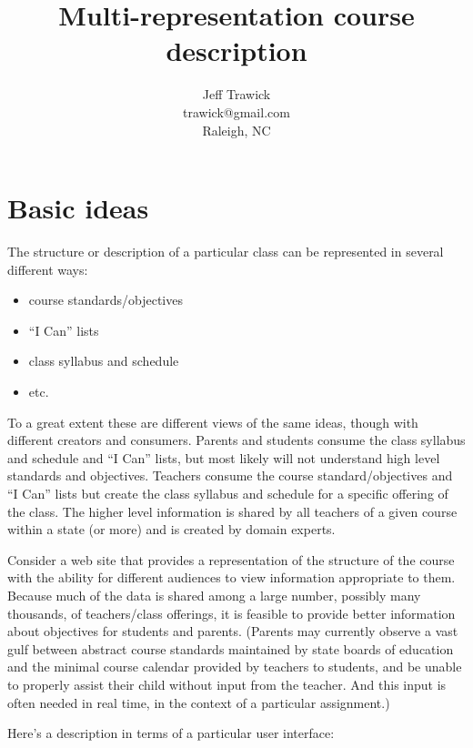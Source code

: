 
\title{Multi-representation course description}
\author{Jeff Trawick\\trawick@gmail.com\\Raleigh, NC}
\maketitle

\section*{Basic ideas}

The structure or description of a particular class can be represented in several
different ways:

\begin{itemize}
\item course standards/objectives
\item ``I Can'' lists
\item class syllabus and schedule
\item etc.
\end{itemize}

To a great extent these are different views of the same ideas, though
with different creators and consumers.  Parents and students consume the
class syllabus and schedule and ``I Can'' lists, but most likely will
not understand high level standards and objectives.  Teachers consume 
the course standard/objectives and ``I Can'' lists but create the class
syllabus and schedule for a specific offering of the class.  
The higher level information is shared by
all teachers of a given course within a state (or more) and is created by
domain experts.

Consider a web site that provides a representation
of the structure of the course with the ability for different audiences
to view information appropriate to them.  Because much of the data is
shared among a large number, possibly many thousands, of teachers/class offerings, it is feasible
to provide better information about objectives for students and parents.  (Parents may
currently observe a vast gulf between abstract course standards
maintained by state boards of education and the minimal course calendar
provided by teachers to students, and be unable to properly assist their
child without input from the teacher.  And this input is often needed
in real time, in the context of a particular assignment.)

Here's a description in terms of a particular user interface:

